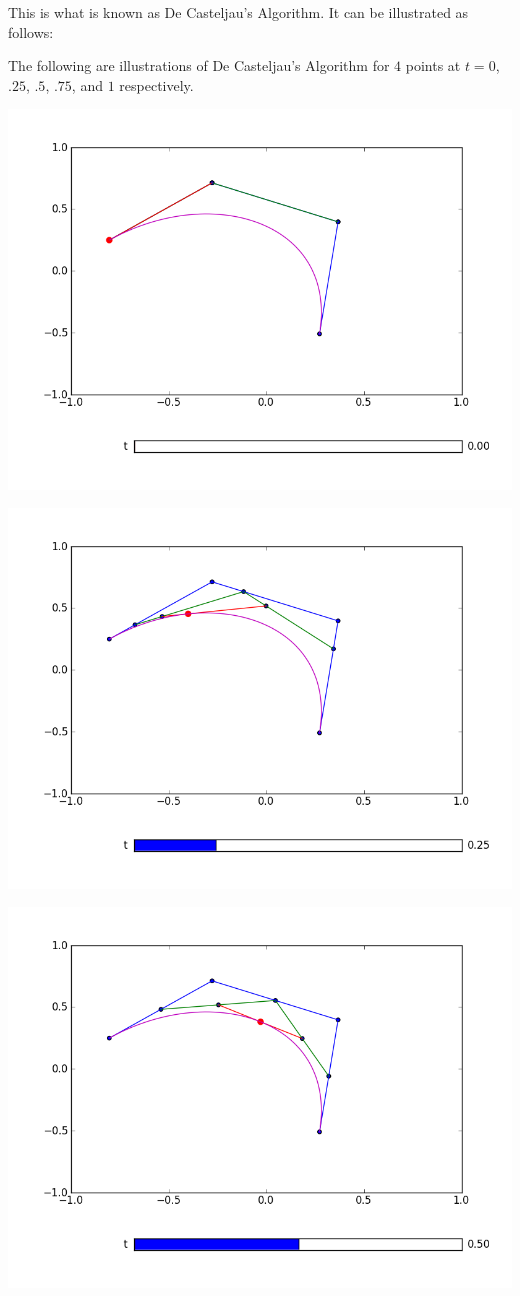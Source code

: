 This is what is known as De Casteljau's Algorithm. 
It can be illustrated as follows:

The following are illustrations of De Casteljau's Algorithm for $4$ points at $t= 0$, $.25$, $.5$, $.75$, and $1$ respectively.

\includegraphics[width=\textwidth]{decasteljau_1}

\includegraphics[width=\textwidth]{decasteljau_2}

\includegraphics[width=\textwidth]{decasteljau_3}

